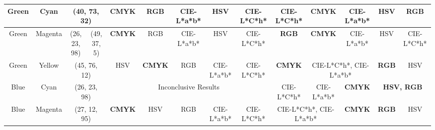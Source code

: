 \begin{table}[htbp]
{\begin{tabular}{@{}cccccccccccccc@{}}
    Green   & \multicolumn{1}{c|}{Cyan}    & \multicolumn{2}{c|}{\cellcolor[HTML]{00FF80}(40, 73, 32)}                                                             & \multicolumn{1}{c|}{\textbf{CMYK}} & \multicolumn{1}{c|}{RGB}           & \multicolumn{1}{c|}{CIE-L*a*b*} & \multicolumn{1}{c|}{HSV}        & \multicolumn{1}{c|}{CIE-L*C*h*} & \multicolumn{1}{c|}{CIE-L*C*h*}    & \multicolumn{1}{c|}{\textbf{CMYK}} & \multicolumn{1}{c|}{CIE-L*a*b*}    & \multicolumn{1}{c|}{HSV}           & \multicolumn{1}{c|}{\textbf{RGB}}  \\ \midrule
    Green   & \multicolumn{1}{c|}{Magenta} & \multicolumn{1}{c|}{\cellcolor[HTML]{0080FF}(26, 23, 98)} & \multicolumn{1}{c|}{\cellcolor[HTML]{FF8000}(49, 37, 5)}  & \multicolumn{1}{c|}{\textbf{CMYK}} & \multicolumn{1}{c|}{RGB}           & \multicolumn{1}{c|}{CIE-L*a*b*} & \multicolumn{1}{c|}{HSV}        & \multicolumn{1}{c|}{CIE-L*C*h*} & \multicolumn{1}{c|}{\textbf{RGB}}  & \multicolumn{1}{c|}{\textbf{CMYK}} & \multicolumn{1}{c|}{CIE-L*a*b*}    & \multicolumn{1}{c|}{HSV}           & \multicolumn{1}{c|}{CIE-L*C*h*}    \\ \midrule
    Green   & \multicolumn{1}{c|}{Yellow}  & \multicolumn{2}{c|}{\cellcolor[HTML]{80FF00}(45, 76, 12)}                                                             & \multicolumn{1}{c|}{HSV}           & \multicolumn{1}{c|}{\textbf{CMYK}} & \multicolumn{1}{c|}{RGB}        & \multicolumn{1}{c|}{CIE-L*a*b*} & \multicolumn{1}{c|}{CIE-L*C*h*} & \multicolumn{1}{c|}{\textbf{CMYK}} & \multicolumn{2}{c|}{CIE-L*C*h*, CIE-L*a*b*}                             & \multicolumn{1}{c|}{\textbf{RGB}}  & \multicolumn{1}{c|}{HSV}           \\ \midrule
    Blue    & \multicolumn{1}{c|}{Cyan}    & \multicolumn{2}{c|}{\cellcolor[HTML]{0080FF}(26, 23, 98)}                                                             & \multicolumn{5}{c|}{Inconclusive Results}                                                                                                                                     & \multicolumn{1}{c|}{CIE-L*C*h*}    & \multicolumn{1}{c|}{CIE-L*a*b*}    & \multicolumn{1}{c|}{\textbf{CMYK}} & \multicolumn{2}{c|}{\textbf{HSV, RGB}}                                  \\ \midrule
    Blue    & \multicolumn{1}{c|}{Magenta} & \multicolumn{2}{c|}{\cellcolor[HTML]{8000FF}(27, 12, 95)}                                                             & \multicolumn{1}{c|}{\textbf{CMYK}} & \multicolumn{1}{c|}{HSV}           & \multicolumn{1}{c|}{RGB}        & \multicolumn{1}{c|}{CIE-L*a*b*} & \multicolumn{1}{c|}{CIE-L*C*h*} & \multicolumn{2}{c|}{CIE-L*C*h*, CIE-L*a*b*}                             & \multicolumn{1}{c|}{\textbf{CMYK}} & \multicolumn{1}{c|}{\textbf{RGB}}  & \multicolumn{1}{c|}{HSV}           \\ \midrule

\end{tabular}}
\end{table}
